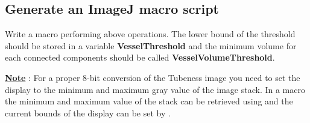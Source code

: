 \subsection{Generate an ImageJ macro script}
Write a macro performing above operations. The lower bound of the threshold should be stored in a variable \textbf{VesselThreshold} and the minimum volume for each connected components should be called \textbf{VesselVolumeThreshold}.

\textbf{\underline{Note}} : For a proper 8-bit conversion of the Tubeness image you need to set the display to the minimum and maximum gray value of the image stack. In a macro the minimum and maximum value of the stack can be retrieved using  and the current bounds of the display can be set by .